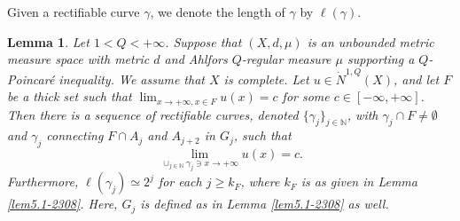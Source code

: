 \documentclass[10pt]{amsart}
\newtheorem{lemma}[theorem]{Lemma}
\numberwithin{equation}{section}
\begin{document}


Given a rectifiable curve $\gamma$, we denote the length of $\gamma$ by $\ell(\gamma)$.

\begin{lemma}\label{lem5.2-2308}
Let  $1<Q<+\infty$. 
Suppose that $(X,d,\mu)$ is an  unbounded metric measure space with metric $d$ and Ahlfors $Q$-regular measure $\mu$ supporting a $Q$-Poincar\'e inequality. We assume that $X$ is complete.
Let $u\in\dot N^{1,Q}(X)$, and let $F$ be a thick set such that $\lim_{x\to+\infty,x\in F}u(x)=c$ for some $c\in[-\infty,+\infty]$. Then there is a sequence of rectifiable curves, denoted $\{\gamma_j\}_{j\in\mathbb N}$, with $\gamma_j\cap F\neq\emptyset$ and $\gamma_j$ connecting $F\cap A_j$ and $A_{j+2}$ in $G_j$, such that \[
\lim_{\cup_{j\in\mathbb N}\gamma_j\ni x\to+\infty}u(x)=c.
\]
Furthermore, $\ell (\gamma_j)\simeq 2^j$ for each $j\ge k_F$, where $k_F$ is as given in Lemma \ref{lem5.1-2308}.
Here, $G_j$ is defined as in Lemma \ref{lem5.1-2308} as well.
\end{lemma}
\end{document}
